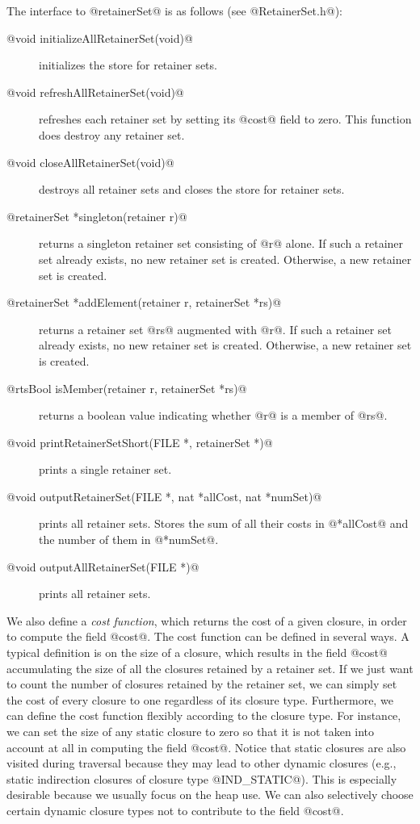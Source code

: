 \documentclass{article}
\begin{document}
The interface to @retainerSet@ is as follows 
(see @RetainerSet.h@):

\begin{description}
\item[@void initializeAllRetainerSet(void)@] initializes the store for retainer sets.
\item[@void refreshAllRetainerSet(void)@] refreshes each retainer set by setting
its @cost@ field to zero. This function does destroy any retainer set.
\item[@void closeAllRetainerSet(void)@] destroys all retainer sets and closes
the store for retainer sets.
\item[@retainerSet *singleton(retainer r)@] returns a singleton retainer set
consisting of @r@ alone. If such a retainer set already exists, no new retainer
set is created. Otherwise, a new retainer set is created.
\item[@retainerSet *addElement(retainer r, retainerSet *rs)@] returns a retainer set
@rs@ augmented with @r@. If such a retainer set already exists, no new retainer set
is created. Otherwise, a new retainer set is created.
\item[@rtsBool isMember(retainer r, retainerSet *rs)@] returns a boolean value
indicating whether @r@ is a member of @rs@.
\item[@void printRetainerSetShort(FILE *, retainerSet *)@] prints a single retainer
set.
\item[@void outputRetainerSet(FILE *, nat *allCost, nat *numSet)@] prints all 
retainer sets. Stores the sum of all their costs in @*allCost@ and the number
of them in @*numSet@.
\item[@void outputAllRetainerSet(FILE *)@] prints all retainer sets.
\end{description}

We also define a \emph{cost function}, which returns the cost of a given closure, 
in order to compute the field @cost@. 
The cost function can be defined in several ways.
A typical definition is on the size of a closure, which results in
the field @cost@ accumulating the size of all the closures retained by a
retainer set.
If we just want to count the number of closures retained by the
retainer set, we can simply set the cost of every closure to one regardless
of its closure type.
Furthermore, we can define the cost function flexibly according to
the closure type. 
For instance, we can set the size of any static closure to zero so that
it is not taken into account at all in computing the field @cost@. 
Notice that static closures are also visited during traversal because they 
may lead to other dynamic closures (e.g., static indirection closures of 
closure type @IND_STATIC@).
This is especially desirable because we usually focus on the heap use.
We can also selectively choose certain dynamic closure types not to contribute 
to the field @cost@.
\end{document}
